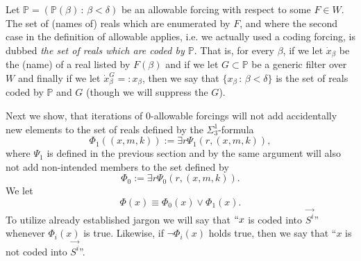 \documentclass[a4paper,11pt]{article}
\newcommand{\forceP}{\mathbb{P}}
\begin{document}






Let $\forceP= (\forceP(\beta) \, : \, \beta < \delta)$ be an allowable forcing with respect to some $F \in W$.
The set of  (names of) reals which are enumerated by $F$, and where the second case in the definition of allowable applies, i.e. we actually used a coding forcing, is dubbed \emph{the set of reals which are coded by $\forceP$}. That is, for every $\beta$, if we let $\dot{x}_{\beta}$ be the (name) of a real  listed by $F(\beta)$ and if we let $G \subset \forceP$ be a generic filter over $W$ and finally if we let
$ \dot{x}_{\beta}^G =:x_{\beta}$,  then we say that
$\{ x_{\beta} \, : \, \beta < \delta \}$ is the set of reals coded by $\forceP$ and $G$ (though we will suppress the $G$).

Next we show, that iterations of 0-allowable forcings will not add accidentally new elements to the set of reals defined by the $\Sigma^1_3$-formula \[\Phi_1((x,m,k)):= \exists r \Psi_1 (r,(x,m,k)), \]
where $\Psi_1$ is defined in the previous section and by the same argument will also not add non-intended members to the set defined by 
\[ \Phi_0 := \exists r \Psi_0( r,(x,m,k)).\] We let
\[ \Phi(x) \equiv \Phi_0 (x) \lor \Phi_1 (x). \]
To utilize already established jargon we will say that $``x$ is coded into $\vec{S^i}$'' whenever $\Phi_i (x)$ is true. Likewise, if $\lnot \Phi_i (x)$ holds true, then we say that ``$x$ is not coded into $\vec{S^i}$''.
\end{document}
